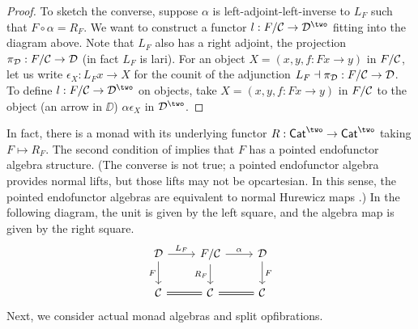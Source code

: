 \begin{proof}
  To sketch the converse,
  suppose $\alpha$ is left-adjoint-left-inverse to $L_F$ such that
  $F \circ \alpha = R_F$.
  We want to construct a functor $l : F / \CC \to \DD^\two$ 
  fitting into the diagram above.
  Note that $L_F$ also has a right adjoint,
  the projection $\pi_{\mathcal{D}} : F / \mathcal{C} \to \mathcal{D}$ (in fact $L_F$ is lari).
  For an object $X = (x,y,f : Fx \to y)$ in $F / \mathcal{C}$,
  let us write $\epsilon_X : L_F x \to X$
  for the counit of the adjunction $L_F \dashv \pi_{\mathcal{D}} : F / \mathcal{C} \to \mathcal{D}$.
  To define $l : F / \CC \to \DD^\two$ on objects,
  take $X = (x,y,f : Fx \to y)$ in $F / \mathcal{C}$ to 
  the object (an arrow in $\DD$) $\alpha \epsilon_X$ in $\DD^\two$.
\end{proof}
In fact, there is a monad with its underlying functor
$R : \Cat^\two \to \Cat^\two$
taking $F \mapsto R_F$.
The second condition of 
implies that $F$ has a
pointed endofunctor algebra structure.
(The converse is not true;
a pointed endofunctor algebra provides normal lifts,
but those lifts may not be opcartesian.
In this sense, the pointed endofunctor algebras are equivalent to
normal Hurewicz maps .)
In the following diagram,
the unit is given by the left square,
and the algebra map is given by the right square.
\[
\begin{tikzcd}
  \DD & {F / \CC} & \DD \\
  \CC & \CC & \CC
  \arrow["{L_F}", from=1-1, to=1-2]
  \arrow["F"', from=1-1, to=2-1]
  \arrow["\alpha", from=1-2, to=1-3]
  \arrow["{R_F}"', from=1-2, to=2-2]
  \arrow["F", from=1-3, to=2-3]
  \arrow[equals, from=2-1, to=2-2]
  \arrow[equals, from=2-2, to=2-3]
\end{tikzcd}
\]
Next, we consider actual monad algebras and split opfibrations.

